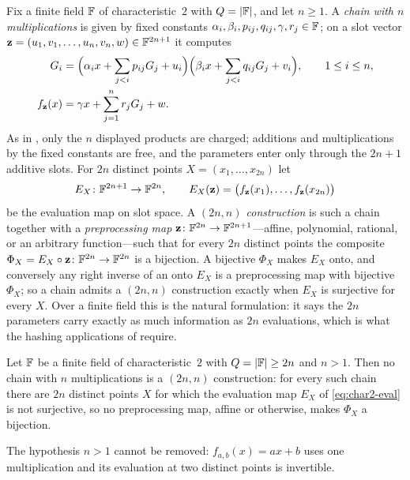 Fix a finite field $\mathbb{F}$ of characteristic~$2$ with $Q=\left\lvert \mathbb{F}\right\rvert$, and let $n\ge1$.  A
\emph{chain with $n$ multiplications} is given by fixed constants
$\alpha_i,\beta_i,p_{ij},q_{ij},\gamma,r_j\in\mathbb{F}$; on a slot vector
$\mathbf z=(u_1,v_1,\dots,u_n,v_n,w)\in\mathbb{F}^{2n+1}$ it computes
\begin{align}
   G_i &=
   \Bigl(\alpha_i x+\sum_{j<i}p_{ij}G_j+u_i\Bigr)
   \Bigl(\beta_i x+\sum_{j<i}q_{ij}G_j+v_i\Bigr),
   \qquad 1\le i\le n,
   \label{eq:char2-gate}\\
   f_{\mathbf z}(x) &= \gamma x+\sum_{j=1}^{n}r_jG_j+w .
   \label{eq:char2-output}
\end{align}
As in , only the $n$ displayed products are charged; additions and
multiplications by the fixed constants are free, and the parameters enter only through the
$2n+1$ additive slots.  For $2n$ distinct points $X=(x_1,\dots,x_{2n})$ let
\begin{equation}
   E_X\colon\mathbb{F}^{2n+1}\to\mathbb{F}^{2n},
   \qquad
   E_X(\mathbf z)=\bigl(f_{\mathbf z}(x_1),\dots,f_{\mathbf z}(x_{2n})\bigr)
   \label{eq:char2-eval}
\end{equation}
be the evaluation map on slot space.  A \emph{$(2n,n)$ construction} is such a chain
together with a \emph{preprocessing map} $\mathbf z\colon\mathbb{F}^{2n}\to\mathbb{F}^{2n+1}$---affine,
polynomial, rational, or an arbitrary function---such that for every $2n$ distinct points
the composite $\Phi_X=E_X\circ\mathbf z\colon\mathbb{F}^{2n}\to\mathbb{F}^{2n}$ is a bijection.  A
bijective $\Phi_X$ makes $E_X$ onto, and conversely any right inverse of an onto $E_X$ is
a preprocessing map with bijective $\Phi_X$; so a chain admits a $(2n,n)$ construction
exactly when $E_X$ is surjective for every $X$.  Over a finite field this is the natural
formulation: it says the $2n$ parameters carry exactly as much information as $2n$
evaluations, which is what the hashing applications of  require.

\begin{theorem}
\label{thm:char2-lower}
Let $\mathbb{F}$ be a finite field of characteristic~$2$ with $Q=\left\lvert \mathbb{F}\right\rvert\ge 2n$ and $n>1$.  Then
no chain with $n$ multiplications is a $(2n,n)$ construction: for every such chain there
are $2n$ distinct points $X$ for which the evaluation map $E_X$ of \eqref{eq:char2-eval}
is not surjective, so no preprocessing map, affine or otherwise, makes $\Phi_X$ a
bijection.
\end{theorem}

The hypothesis $n>1$ cannot be removed: $f_{a,b}(x)=ax+b$ uses one multiplication and its
evaluation at two distinct points is invertible.


